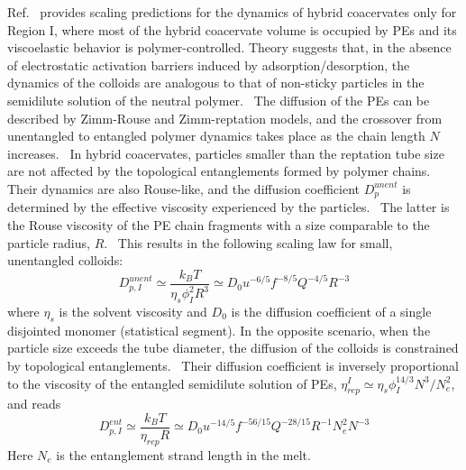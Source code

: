 \documentclass[journal=mamobx, manuscript=article]{achemso}
\begin{document}
Ref.~ provides scaling predictions for the dynamics of hybrid coacervates only for Region I, where most of the hybrid coacervate volume is occupied by PEs and its viscoelastic behavior is polymer-controlled. Theory suggests that, in the absence of electrostatic activation barriers induced by adsorption/desorption, the dynamics of the colloids are analogous to that of non-sticky particles in the semidilute solution of the neutral polymer.~\cite{cai2011mobility} The diffusion of the PEs can be described by Zimm-Rouse and Zimm-reptation models, and the crossover from unentangled to entangled polymer dynamics takes place as the chain length $N$ increases.~\cite{yu2020crossover,rubinstein2003polymer} In hybrid coacervates, particles smaller than the reptation tube size are not affected by the topological entanglements formed by polymer chains. Their dynamics are also Rouse-like, and the diffusion coefficient $D_{p}^{unent}$ is determined by the effective viscosity experienced by the particles.~\cite{gennes2000mobility} The latter is the Rouse viscosity of the PE chain fragments with a size comparable to the particle radius, $R$.~\cite{gennes2000mobility, cai2011mobility, schweizer2014, ge2017nanoparticle, ge2023scaling} This results in the following scaling law for small, unentangled colloids:~\cite{artem2022hybrid} 
\begin{equation}
\label{eq:D-Rouse}
D_{p, I}^{unent} \simeq \frac{k_{B}T}{\eta_{s}\phi_{I}^{2}R^{3}} \simeq D_{0}u^{−6/5}f^{−8/5}Q^{−4/5}R^{−3}
\end{equation}
where $\eta_{s}$ is the solvent viscosity and $D_{0}$ is the diffusion coefficient of a single disjointed monomer (statistical segment). In the opposite scenario, when the particle size exceeds the tube diameter, the diffusion of the colloids is constrained by topological entanglements.~\cite{cai2011mobility,ge2017nanoparticle,ge2023scaling} Their diffusion coefficient is inversely proportional to the viscosity of the entangled semidilute solution of PEs, $\eta_{rep}^{I} \simeq \eta_{s} \phi_{I}^{14/3} N^3 / N_e^2$, and reads~\cite{artem2022hybrid} 
\begin{equation}
\label{eq:D-rep}
D_{p, I}^{ent} \simeq \frac{k_B T}{\eta_{rep} R}  
\simeq D_{0}u^{−14/5}f^{−56/15}Q^{−28/15}R^{−1}N_{e}^{2}N^{-3}
\end{equation}
Here $N_{e}$ is the entanglement strand length in the melt.
\end{document}
